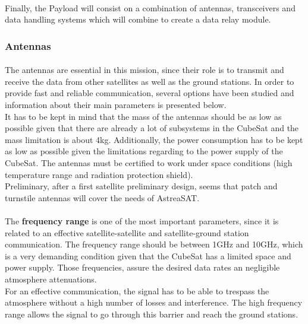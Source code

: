 \paragraph{} Finally, the Payload will consist on a combination of antennas, transceivers and data handling systems which will combine to create a data relay module.

\subsubsection{Antennas}
\paragraph{}The antennas are essential in this mission, since their role is to transmit and receive the data from other satellites as well as the ground stations. In order to provide fast and reliable communication, several options have been studied and information about their main parameters is presented below.\\
It has to be kept in mind that the mass of the antennas should be as low as possible given that there are already a lot of subsystems in the CubeSat and the mass limitation is about 4kg.
Additionally, the power consumption has to be kept as low as possible given the limitations regarding to the power supply of the CubeSat. The antennas must be certified to work under space conditions (high temperature range and radiation protection shield).\\
Preliminary, after a first satellite preliminary design, seems that patch and turnstile antennas will cover the needs of AstreaSAT.  

\paragraph{}The \textbf{frequency range} is one of the most important parameters, since it is related to an effective satellite-satellite and satellite-ground station communication. The frequency range should be between 1GHz and 10GHz, which is a very demanding condition given that the CubeSat has a limited space and power supply. Those frequencies, assure the desired data rates an negligible atmosphere attenuations. \\
For an effective communication, the signal has to be able to trespass the atmosphere without a high number of losses and interference. The high frequency range allows the signal to go through this barrier and reach the ground stations.

